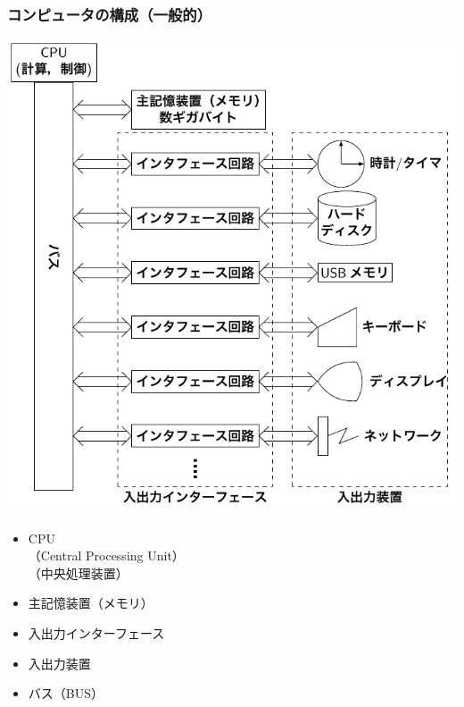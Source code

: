 \documentclass[handout]{beamer}        %
\begin{document}
\begin{frame}
  \frametitle{コンピュータの構成（一般的）}
  \begin{minipage}{0.59\columnwidth}
    \centerline{\includegraphics[scale=0.63]{../Tikz/kousei1.pdf}}
  \end{minipage}
  \begin{minipage}{0.4\columnwidth}
    \begin{itemize}
    \item CPU\\
      {\small（Central Processing Unit）}\\
      {\small（中央処理装置）}\\
      \vspace{4ex}
    \item 主記憶装置（メモリ）\\
      \vspace{4ex}
    \item 入出力インターフェース\\
      \vspace{4ex}
    \item 入出力装置\\
      \vspace{4ex}
    \item バス（BUS）\\
      \vspace{6ex}
    \end{itemize}
  \end{minipage}
\end{frame}
\end{document}
